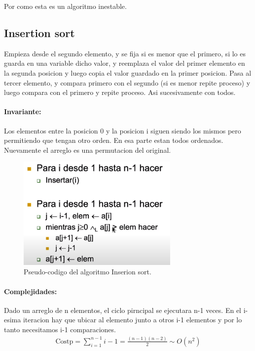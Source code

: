 \documentclass[11pt]{article}
\begin{document}
Por como esta es un algoritmo inestable.
\subsection{Insertion sort}
Empieza desde el segundo elemento, y se fija si es menor que el primero,
si lo es guarda en una variable dicho valor, y reemplaza el valor del primer
elemento en la segunda posicion y luego copia el valor guardado en la
primer posicion.
Pasa al tercer elemento, y compara primero con el segundo (si es menor
repite proceso) y luego compara con el primero y repite proceso.
Asi sucesivamente con todos.

\paragraph{Invariante:}
Los elementos entre la posicion 0 y la posicion i siguen siendo
los mismos pero permitiendo que tengan otro orden.
En esa parte estan todos ordenados.
Nuevamente el arreglo es una permutacion del original.

\begin{figure}[h!]
    \centering
    \includegraphics[width=0.7\textwidth]{insertion.png}
    \caption{Pseudo-codigo del algoritmo Inserion sort.}
    \label{fig:insertion}
\end{figure}


\paragraph{Complejidades:}
Dado un arreglo de n elementos, el ciclo pirncipal se ejecutara n-1 veces.
En el i-esima iteracion hay que ubicar al elemento junto a otros  i-1
elementos y por lo tanto necesitamos i-1 comparaciones.
\begin{align*}
    \text{Costp}=\sum_{i=1}^{n-1}i-1=\frac{(n-1)(n-2)}{2}\sim O(n^2)
\end{align*}
\end{document}

